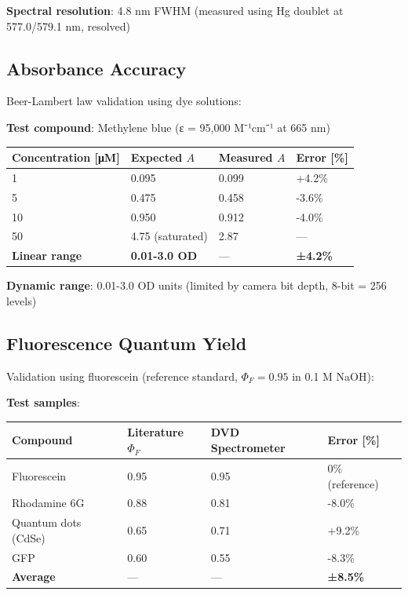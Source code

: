 \documentclass[12pt,a4paper]{article}
\begin{document}
\textbf{Spectral resolution}: 4.8 nm FWHM (measured using Hg doublet at 577.0/579.1 nm, resolved)

\subsection{Absorbance Accuracy}

Beer-Lambert law validation using dye solutions:

\textbf{Test compound}: Methylene blue (ε = 95,000 M⁻¹cm⁻¹ at 665 nm)

\begin{center}
\begin{tabular}{|l|l|l|l|}
\hline
\textbf{Concentration [μM]} & \textbf{Expected $A$} & \textbf{Measured $A$} & \textbf{Error [\%]} \\
\hline
1 & 0.095 & 0.099 & +4.2\% \\
5 & 0.475 & 0.458 & -3.6\% \\
10 & 0.950 & 0.912 & -4.0\% \\
50 & 4.75 (saturated) & 2.87 & — \\
\hline
\textbf{Linear range} & \textbf{0.01-3.0 OD} & — & \textbf{±4.2\%} \\
\hline
\end{tabular}
\end{center}

\textbf{Dynamic range}: 0.01-3.0 OD units (limited by camera bit depth, 8-bit = 256 levels)

\subsection{Fluorescence Quantum Yield}

Validation using fluorescein (reference standard, $\Phi_F = 0.95$ in 0.1 M NaOH):

\textbf{Test samples}:
\begin{center}
\begin{tabular}{|l|l|l|l|}
\hline
\textbf{Compound} & \textbf{Literature $\Phi_F$} & \textbf{DVD Spectrometer} & \textbf{Error [\%]} \\
\hline
Fluorescein & 0.95 & 0.95 & 0\% (reference) \\
Rhodamine 6G & 0.88 & 0.81 & -8.0\% \\
Quantum dots (CdSe) & 0.65 & 0.71 & +9.2\% \\
GFP & 0.60 & 0.55 & -8.3\% \\
\hline
\textbf{Average} & — & — & \textbf{±8.5\%} \\
\hline
\end{tabular}
\end{center}
\end{document}
